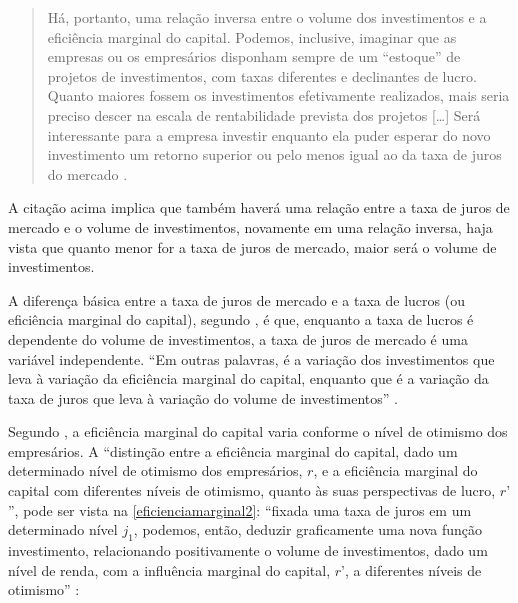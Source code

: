 \documentclass[]{article}
\begin{document}
\begin{quote}
Há, portanto, uma relação inversa entre o volume dos investimentos e a
eficiência marginal do capital. Podemos, inclusive, imaginar que as
empresas ou os empresários disponham sempre de um ``estoque'' de
projetos de investimentos, com taxas diferentes e declinantes de lucro.
Quanto maiores fossem os investimentos efetivamente realizados, mais
seria preciso descer na escala de rentabilidade prevista dos projetos
{[}\ldots{}{]} Será interessante para a empresa investir enquanto ela
puder esperar do novo investimento um retorno superior ou pelo menos
igual ao da taxa de juros do mercado \cite[p.~5]{Bresser-Pereira1973}.
\end{quote}

A citação acima implica que também haverá uma relação entre a taxa de
juros de mercado e o volume de investimentos, novamente em uma relação
inversa, haja vista que quanto menor for a taxa de juros de mercado,
maior será o volume de investimentos.

A diferença básica entre a taxa de juros de mercado e a taxa de lucros
(ou eficiência marginal do capital), segundo
, é que, enquanto a taxa de lucros
é dependente do volume de investimentos, a taxa de juros de mercado é
uma variável independente. ``Em outras palavras, é a variação dos
investimentos que leva à variação da eficiência marginal do capital,
enquanto que é a variação da taxa de juros que leva à variação do volume
de investimentos'' \cite[]{Bresser-Pereira1973}.

Segundo , a eficiência marginal do
capital varia conforme o nível de otimismo dos empresários. A
``distinção entre a eficiência marginal do capital, dado um determinado
nível de otimismo dos empresários, \(r\), e a eficiência marginal do
capital com diferentes níveis de otimismo, quanto às suas perspectivas
de lucro, \(r’\)'', pode ser vista na \autoref{eficienciamarginal2}:
``fixada uma taxa de juros em um determinado nível \(j_1\), podemos,
então, deduzir graficamente uma nova função investimento, relacionando
positivamente o volume de investimentos, dado um nível de renda, com a
influência marginal do capital, \(r’\), a diferentes níveis de
otimismo'' \cite[p.~8]{Bresser-Pereira1973}:
\end{document}
